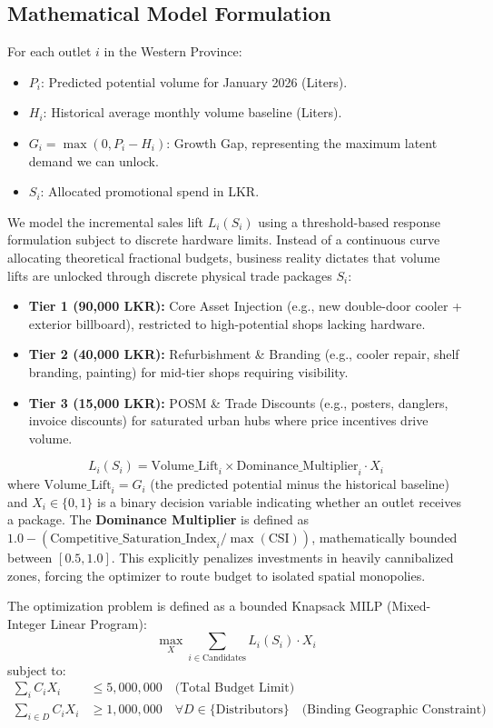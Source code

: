 \documentclass[10pt,a4paper]{article}
\begin{document}
\subsection{Mathematical Model Formulation}
For each outlet $i$ in the Western Province:
\begin{itemize}
    \item $P_i$: Predicted potential volume for January 2026 (Liters).
    \item $H_i$: Historical average monthly volume baseline (Liters).
    \item $G_i = \max(0, P_i - H_i)$: Growth Gap, representing the maximum latent demand we can unlock.
    \item $S_i$: Allocated promotional spend in LKR.
\end{itemize}
We model the incremental sales lift $L_i(S_i)$ using a threshold-based response formulation subject to discrete hardware limits. Instead of a continuous curve allocating theoretical fractional budgets, business reality dictates that volume lifts are unlocked through discrete physical trade packages $S_i$:
\begin{itemize}
    \item \textbf{Tier 1 (90,000 LKR):} Core Asset Injection (e.g., new double-door cooler + exterior billboard), restricted to high-potential shops lacking hardware.
    \item \textbf{Tier 2 (40,000 LKR):} Refurbishment \& Branding (e.g., cooler repair, shelf branding, painting) for mid-tier shops requiring visibility.
    \item \textbf{Tier 3 (15,000 LKR):} POSM \& Trade Discounts (e.g., posters, danglers, invoice discounts) for saturated urban hubs where price incentives drive volume.
\end{itemize}
\[ L_i(S_i) = \text{Volume\_Lift}_i \times \text{Dominance\_Multiplier}_i \cdot X_i \]
where $\text{Volume\_Lift}_i = G_i$ (the predicted potential minus the historical baseline) and $X_i \in \{0, 1\}$ is a binary decision variable indicating whether an outlet receives a package. The \textbf{Dominance Multiplier} is defined as $1.0 - (\text{Competitive\_Saturation\_Index}_i / \max(\text{CSI}))$, mathematically bounded between $[0.5, 1.0]$. This explicitly penalizes investments in heavily cannibalized zones, forcing the optimizer to route budget to isolated spatial monopolies.

The optimization problem is defined as a bounded Knapsack MILP (Mixed-Integer Linear Program):
\[ \max_{X} \sum_{i \in \text{Candidates}} L_i(S_i) \cdot X_i \]
subject to:
\begin{align*}
    \sum_i C_i X_i & \le 5,000,000 \quad \text{(Total Budget Limit)} \\
    \sum_{i \in D} C_i X_i & \ge 1,000,000 \quad \forall D \in \{\text{Distributors}\} \quad \text{(Binding Geographic Constraint)}
\end{align*}
\end{document}
